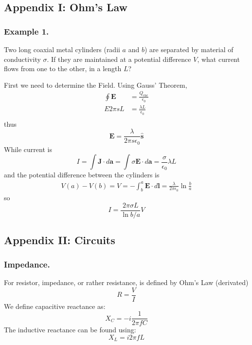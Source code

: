 \documentclass[../../../main.tex]{subfiles}
\begin{document}
\subsection{Appendix I: Ohm's Law}
\subsubsection{Example 1.} Two long coaxial metal cylinders (radii $a$ and $b$) are separated by material of conductivity $\sigma$. If they are maintained at a potential difference $V$, what current ﬂows from one to the other, in a length $L$?

First we need to determine the Field. Using Gauss' Theorem,
\begin{align*}
    \oint \mathbf{E}&=\frac{Q_\text{enc}}{\epsilon_0}\\
    E2\pi sL&=\frac{\lambda L}{\epsilon_0}\\
\end{align*}
thus
\begin{equation*}
    \mathbf{E}=\frac{\lambda}{2\pi s\epsilon_0}\mathbf{\hat{s}}
\end{equation*}
While current is
\begin{equation*}
    I=\int \mathbf{J}\cdot d\mathbf{a}=\int \sigma\mathbf{E}\cdot d\mathbf{a}=\frac{\sigma}{\epsilon_0}\lambda L
\end{equation*}
and the potential difference between the cylinders is
\begin{align*}
    V(a)-V(b)=V=-\int_{b}^{a}\mathbf{E}\cdot d\mathbf{l}=\frac{\lambda}{2\pi\epsilon_0}\ln \frac{b}{a}
\end{align*}
so
\begin{equation*}
    I=\frac{2\pi\sigma L}{\ln b/a}V
\end{equation*}
\begin{figure}[h]
    \centering
\end{figure}

\subsection{Appendix II: Circuits}
\subsubsection{Impedance.} For resistor, impedance, or rather resistance, is defined by Ohm's Law (derivated) 
\begin{equation*}
    R=\frac{V}{I}
\end{equation*}
We define capacitive reactance as:
\begin{equation*}
    X_C=-i\frac{1}{2\pi fC}
\end{equation*}
The inductive reactance can be found using:
\begin{equation*}
    X_L=i2\pi f L
\end{equation*}
\end{document}

